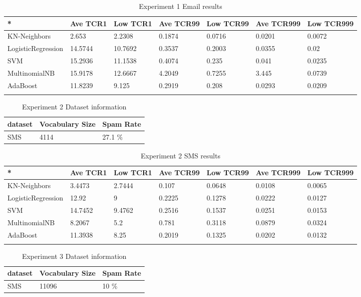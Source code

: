 \documentclass[11pt,a4paper]{article}
\begin{document}
\begin{table}[t!]
\centering
\begin{tabular}{lllllll}
 *& Ave TCR1 &Low TCR1&Ave TCR99&Low TCR99&Ave TCR999&Low TCR999\\
  \hline
  KN-Neighbors& 2.653&	2.2308&	0.1874&	0.0716&	0.0201&	0.0072	\\
LogisticRegression& 14.5744&	10.7692&	0.3537&	0.2003&	0.0355	&0.02	\\
SVM& 15.2936&	11.1538&	0.4074&	0.235&	0.041	&0.0235	\\
MultinomialNB &15.9178&	12.6667&	4.2049&	0.7255&	3.445&	0.0739	\\
AdaBoost& 11.8239&	9.125&	0.2919&	0.208&	0.0293&	0.0209	\\

 \\
\end{tabular}
\caption{Experiment 1 Email results}
\end{table}


\begin{table}[t!]
\centering
\begin{tabular}{lll}
  dataset & Vocabulary Size & Spam Rate\\
  \hline
  SMS & 4114 &27.1 \% \\
\end{tabular}
\caption{Experiment 2 Dataset information}
\end{table}


\begin{table}[t!]
\centering
\begin{tabular}{lllllll}
 *& Ave TCR1 &Low TCR1&Ave TCR99&Low TCR99&Ave TCR999&Low TCR999\\
  \hline
  KN-Neighbors& 3.4473&	2.7444&	0.107&	0.0648&	0.0108&	0.0065	\\
LogisticRegression& 12.92&	9&	0.2225&	0.1278&	0.0222&	0.0127	\\
SVM& 14.7452&	9.4762&	0.2516&	0.1537&	0.0251&	0.0153	\\
MultinomialNB &8.2067&	5.2&	0.781&	0.3118&	0.0879&	0.0324	\\
AdaBoost& 11.3938&	8.25&	0.2019&	0.1325&	0.0202&	0.0132	\\

 \\
\end{tabular}
\caption{Experiment 2 SMS results}
\end{table}

\begin{table}[t!]
\centering
\begin{tabular}{lll}
  dataset & Vocabulary Size & Spam Rate\\
  \hline
  SMS & 11096 &10 \% \\
\end{tabular}
\caption{Experiment 3 Dataset information}
\end{table}
\end{document}
